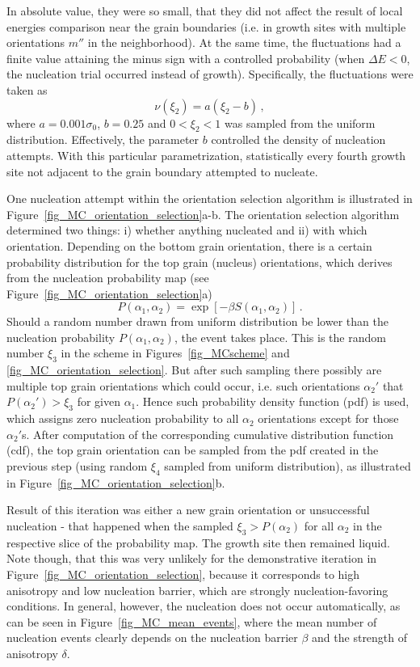 In absolute value, they were so small, that they did not affect the result of local energies comparison near the grain boundaries (i.e. in growth sites with multiple orientations $m''$ in the neighborhood). At the same time, the fluctuations had a finite value attaining the minus sign with a controlled probability (when $\Delta E<0$, the nucleation trial occurred instead of growth). Specifically, the fluctuations were taken as
\begin{equation}
	\nu(\xi_2) = a(\xi_2-b) \,,
\end{equation}
where $a=0.001\sigma_0$, $b=0.25$ and $0<\xi_2<1$ was sampled from the uniform distribution. Effectively, the parameter $b$ controlled the density of nucleation attempts. With this particular parametrization, statistically every fourth growth site not adjacent to the grain boundary attempted to nucleate.

One nucleation attempt within the orientation selection algorithm is illustrated in Figure~\ref{fig_MC_orientation_selection}a-b. The orientation selection algorithm determined two things: i) whether anything nucleated and ii) with which orientation. Depending on the bottom grain orientation, there is a certain probability distribution for the top grain (nucleus) orientations, which derives from the nucleation probability map (see Figure~\ref{fig_MC_orientation_selection}a)
\begin{equation}
	P(\alpha_1,\alpha_2) = \exp[-\beta S(\alpha_1,\alpha_2)] \,.
\end{equation}
Should a random number drawn from uniform distribution be lower than the nucleation probability $P(\alpha_1,\alpha_2)$, the event takes place. This is the random number $\xi_3$ in the scheme in Figures~\ref{fig_MCscheme} and \ref{fig_MC_orientation_selection}. But after such sampling there possibly are multiple top grain orientations which could occur, i.e. such orientations $\alpha_2'$ that $P(\alpha_2')>\xi_3$ for given $\alpha_1$. Hence such probability density function (pdf) is used, which assigns zero nucleation probability to all $\alpha_2$ orientations except for those $\alpha_2'$s. After computation of the corresponding cumulative distribution function (cdf), the top grain orientation can be sampled from the pdf created in the previous step (using random $\xi_4$ sampled from uniform distribution), as illustrated in Figure~\ref{fig_MC_orientation_selection}b.

Result of this iteration was either a new grain orientation or unsuccessful nucleation - that happened when the sampled $\xi_3>P(\alpha_2)$ for all $\alpha_2$ in the respective slice of the probability map. The growth site then remained liquid. Note though, that this was very unlikely for the demonstrative iteration in Figure~\ref{fig_MC_orientation_selection}, because it corresponds to high anisotropy and low nucleation barrier, which are strongly nucleation-favoring conditions. In general, however, the nucleation does not occur automatically, as can be seen in Figure~\ref{fig_MC_mean_events}, where the mean number of nucleation events clearly depends on the nucleation barrier $\beta$ and the strength of anisotropy $\delta$.

